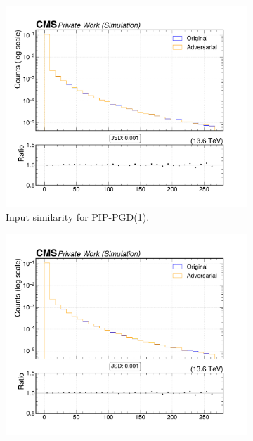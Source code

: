 \begin{figure}[htbp]
  \centering
  \begin{subfigure}[t]{0.32\textwidth}
    \includegraphics[width=\linewidth]{media/output/features/compare/combined_it_1/cmp_vtx_arr_sv_d3dsig.pdf}
    \caption*{Input similarity for PIP-PGD(1).}
  \end{subfigure}\hfill
  \begin{subfigure}[t]{0.32\textwidth}
    \includegraphics[width=\linewidth]{media/output/features/compare/combined_it_2/cmp_vtx_arr_sv_d3dsig.pdf}

\end{subfigure}
\end{figure}
